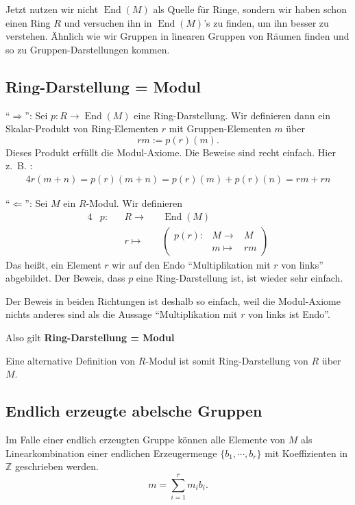 \documentclass[a4paper]{amsart}
\theoremstyle{definition}
\DeclareMathOperator{\End}{End}
\newcommand{\Z}{\ensuremath{\mathbb{ Z }}}
\newcommand{\zb}{z.~B. }
\begin{document}
Jetzt nutzen wir nicht $\End(M)$ als Quelle für Ringe, sondern wir haben schon einen Ring $R$ und versuchen ihn in $\End(M)$'s zu finden, um ihn besser zu verstehen. Ähnlich wie wir Gruppen in linearen Gruppen von Räumen finden und so zu Gruppen-Darstellungen kommen.

\subsection{Ring-Darstellung = Modul}
"`$\Rightarrow$"': Sei $p \colon R \to \End(M)$ eine Ring-Darstellung. Wir definieren dann ein Skalar-Produkt von Ring-Elementen $r$ mit Gruppen-Elementen $m$ über
\begin{equation}
   rm := p(r)(m).
\end{equation} 
Dieses Produkt erfüllt die Modul-Axiome. Die Beweise sind recht einfach. Hier \zb:
\begin{alignat}{4}
   r(m+n) = p(r)(m+n) = p(r)(m) + p(r)(n) = rm + rn
\end{alignat}

"`$\Leftarrow$"': Sei $M$ ein $R$-Modul. Wir definieren
\begin{alignat}{4}
   &p \colon &&R \to     &&\End(M)\\
   &         &&r \mapsto &&\begin{pmatrix}
                              p(r) \colon &M \to     &M\\
                                          &m \mapsto &rm
                           \end{pmatrix}
\end{alignat}
Das heißt, ein Element $r$ wir auf den Endo "`Multiplikation mit $r$ von links"' abgebildet.
Der Beweis, dass $p$ eine Ring-Darstellung ist, ist wieder sehr einfach.

Der Beweis in beiden Richtungen ist deshalb so einfach, weil die Modul-Axiome nichts anderes sind als die Aussage "`Multiplikation mit $r$ von links ist Endo"'.

Also gilt \textbf{Ring-Darstellung = Modul}

Eine alternative Definition von $R$-Modul ist somit Ring-Darstellung von $R$ über $M$.

\subsection{Endlich erzeugte abelsche Gruppen}
Im Falle einer endlich erzeugten Gruppe können alle Elemente von $M$ als Linearkombination einer endlichen Erzeugermenge $\{b_1, \cdots, b_r\}$ mit Koeffizienten in $\Z$ geschrieben werden.
\begin{equation}
   m = \sum_{i=1}^r m_i b_i.
\end{equation}
\end{document}

